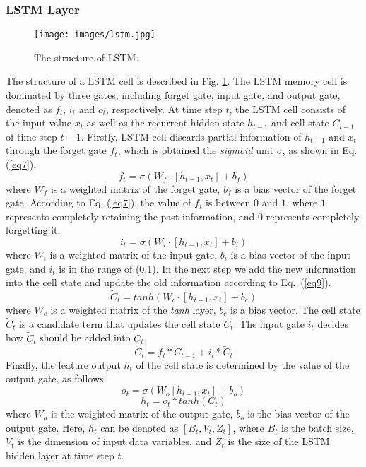 \documentclass[sn-mathphys]{sn-jnl}%
\theoremstyle{thmstyleone}%
\theoremstyle{thmstyletwo}%
\theoremstyle{thmstylethree}%
\begin{document}
\subsubsection{LSTM Layer}\label{LSTM Layer}
\begin{figure}[h]%
	\centering
	\texttt{[image: images/lstm.jpg]}
	\caption{The structure of LSTM.} \label{fig3}
\end{figure}
The structure of a LSTM cell is described in Fig. \ref{fig3}. The LSTM memory cell is dominated by three gates, including forget gate, input gate, and output gate, denoted as $f_t$, $i_t$ and $o_t$, respectively. At time step $t$, the LSTM cell consists of the input value $x_t$ as well as the recurrent hidden state $h_{t-1}$ and cell state $C_{t-1}$ of time step $t-1$. Firstly, LSTM cell discards partial information of $h_{t-1}$ and $x_t$ through the forget gate $f_t$, which is obtained the \emph{sigmoid} unit $\sigma$, as shown in Eq. (\ref{eq7}).
\begin{equation}
f_t=\sigma\left(W_f \cdot\left[h_{t-1}, x_t\right]+b_f\right) \label{eq7}
\end{equation}
where $W_f$ is a weighted matrix of the forget gate, $b_f$ is a bias vector of the forget gate. According to Eq. (\ref{eq7}), the value of $f_t$ is between $0$ and $1$, where $1$ represents completely retaining the past information, and $0$ represents completely forgetting it.
\begin{equation}
i_t=\sigma\left(W_i \cdot\left[h_{t-1}, x_t\right]+b_i\right) \label{eq8}
\end{equation}
where $W_i$ is a weighted matrix of the input gate, $b_i$ is a bias vector of the input gate, and $i_t$ is in the range of (0,1). In the next step we add the new information into the cell state and update the old information according to Eq.~(\ref{eq9}).
\begin{equation}
\tilde{C}_t=tanh \left(W_c \cdot\left[h_{t-1}, x_t\right]+b_c\right) \label{eq9}
\end{equation}
where $W_c$ is a weighted matrix of the \emph{tanh} layer, $b_c$ is a bias vector. The cell state $\tilde{C}_t$ is a candidate term that updates the cell state $C_t$. The input gate $i_t$ decides how $\tilde{C}_t$ should be added into $C_t$.
\begin{equation}
C_t=f_t * C_{t-1}+i_t * \tilde{C}_t \label{eq10}
\end{equation}
Finally, the feature output $h_t$ of the cell state is determined by the value of the output gate, as follows:
\begin{equation}
o_t=\sigma\left(W_o\left[h_{t-1}, x_t\right]+b_o\right) \label{eq11}
\end{equation}
\begin{equation}
h_t=o_t * tanh \left(C_t\right) \label{eq12}
\end{equation}
where $W_o$ is the weighted matrix of the output gate, $b_o$ is the bias vector of the output gate. Here, $h_t$ can be denoted as $[B_t,V_t,Z_t]$, where $B_t$ is the batch size, $V_t$ is the dimension of input data variables, and $Z_t$ is the size of the LSTM hidden layer at time step $t$.
\end{document}
